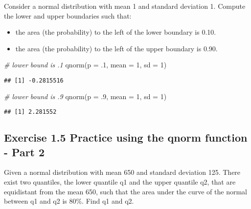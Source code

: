 \documentclass[
]{article}
\newenvironment{Shaded}{\begin{snugshade}}{\end{snugshade}}
\newcommand{\AttributeTok}[1]{\textcolor[rgb]{0.77,0.63,0.00}{#1}}
\newcommand{\CommentTok}[1]{\textcolor[rgb]{0.56,0.35,0.01}{\textit{#1}}}
\newcommand{\DecValTok}[1]{\textcolor[rgb]{0.00,0.00,0.81}{#1}}
\newcommand{\FunctionTok}[1]{\textcolor[rgb]{0.00,0.00,0.00}{#1}}
\newcommand{\NormalTok}[1]{#1}
\providecommand{\tightlist}{%
  \setlength{\itemsep}{0pt}\setlength{\parskip}{0pt}}
\begin{document}
Consider a normal distribution with mean 1 and standard deviation 1.
Compute the lower and upper boundaries such that:

\begin{itemize}
\tightlist
\item
  the area (the probability) to the left of the lower boundary is 0.10.
\item
  the area (the probability) to the left of the upper boundary is 0.90.
\end{itemize}

\begin{Shaded}
\begin{Highlighting}[]
\CommentTok{\# lower bound is .1}
\FunctionTok{qnorm}\NormalTok{(}\AttributeTok{p =}\NormalTok{ .}\DecValTok{1}\NormalTok{,}
      \AttributeTok{mean =} \DecValTok{1}\NormalTok{, }\AttributeTok{sd =} \DecValTok{1}\NormalTok{)}
\end{Highlighting}
\end{Shaded}

\begin{verbatim}
## [1] -0.2815516
\end{verbatim}

\begin{Shaded}
\begin{Highlighting}[]
\CommentTok{\# lower bound is .9}
\FunctionTok{qnorm}\NormalTok{(}\AttributeTok{p =}\NormalTok{ .}\DecValTok{9}\NormalTok{,}
      \AttributeTok{mean =} \DecValTok{1}\NormalTok{, }\AttributeTok{sd =} \DecValTok{1}\NormalTok{)}
\end{Highlighting}
\end{Shaded}

\begin{verbatim}
## [1] 2.281552
\end{verbatim}

\hypertarget{exercise-1.5-practice-using-the-qnorm-function---part-2}{%
\subsection{Exercise 1.5 Practice using the qnorm function - Part
2}\label{exercise-1.5-practice-using-the-qnorm-function---part-2}}

Given a normal distribution with mean 650 and standard deviation 125.
There exist two quantiles, the lower quantile q1 and the upper quantile
q2, that are equidistant from the mean 650, such that the area under the
curve of the normal between q1 and q2 is 80\%. Find q1 and q2.
\end{document}
